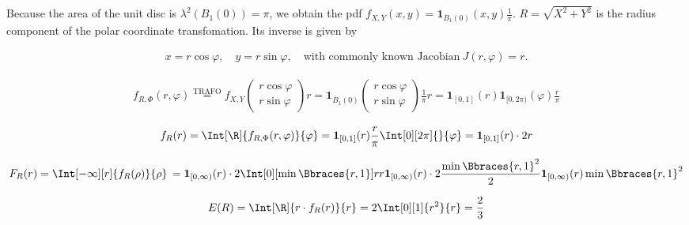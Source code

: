 \begin{solution}

Because the area of the unit disc is $\lambda^2(B_1(0)) = \pi$, we obtain the pdf $f_{X, Y}(x, y) = \mathbf 1_{B_1(0)}(x, y) \frac{1}{\pi}$.
$R = \sqrt{X^2 + Y^2}$ is the radius component of the polar coordinate transfomation.
Its inverse is given by

\begin{align*}
    x = r \cos \varphi,
    \quad
    y = r \sin \varphi,
    \quad
    \text{with commonly known Jacobian}~
    J(r, \varphi) = r.
\end{align*}

\begin{align*}
    f_{R, \Phi}(r, \varphi)
    \stackrel
    {
        \text{TRAFO}
    }{=}
    f_{X, Y}
    \begin{pmatrix}
        r \cos \varphi \\
        r \sin \varphi
    \end{pmatrix}
    r
    =
    \mathbf 1_{\overline B_1(0)}
    \begin{pmatrix}
        r \cos \varphi \\
        r \sin \varphi
    \end{pmatrix}
    \frac{1}{\pi}
    r
    =
    \mathbf 1_{[0, 1]}(r)
    \mathbf 1_{[0, 2 \pi)}(\varphi)
    \frac{r}{\pi}
\end{align*}

\begin{align*}
    f_R(r)
    =
    \Int[\R]{f_{R, \Phi}(r, \varphi)}{\varphi}
    =
    \mathbf 1_{[0, 1]}(r) \frac{r}{\pi} \Int[0][2 \pi]{}{\varphi}
    =
    \mathbf 1_{[0, 1]}(r) \cdot 2 r
\end{align*}

\begin{align*}
    F_R(r)
    =
    \Int[-\infty][r]{f_R(\rho)}{\rho} \,
    =
    \mathbf 1_{[0, \infty)}(r) \cdot 2 \Int[0][\min \Bbraces{r, 1}]{r}{r}
    \mathbf 1_{[0, \infty)}(r) \cdot 2 \frac{\min \Bbraces{r, 1}^2}{2}
    \mathbf 1_{[0, \infty)}(r) \min \Bbraces{r, 1}^2
\end{align*}

\begin{align*}
    E(R)
    =
    \Int[\R]{r \cdot f_R(r)}{r}
    =
    2 \Int[0][1]{r^2}{r}
    =
    \frac{2}{3}
\end{align*}

\end{solution}

